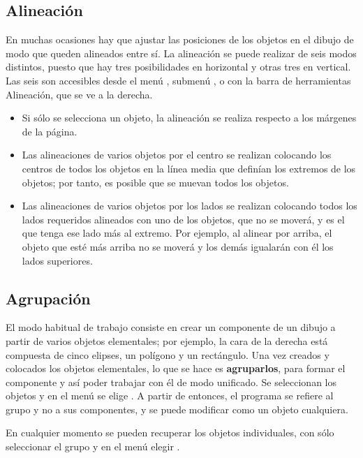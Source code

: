 \subsection{Alineación}

En muchas ocasiones hay que ajustar las posiciones de los objetos en
el dibujo de modo que queden alineados entre sí. La alineación se
puede realizar de seis modos distintos, puesto que hay tres
posibilidades en horizontal y otras tres en vertical. Las seis son
accesibles desde el menú , submenú ,
o con la barra de herramientas Alineación, que se ve a la derecha.

\begin{itemize}
\item Si sólo se selecciona un objeto, la alineación se realiza 
respecto a los márgenes de la página.

\item Las alineaciones de varios objetos por el centro se realizan 
colocando los centros de todos los objetos en la línea media que 
definían los extremos de los objetos; por tanto, es posible que se 
muevan todos los objetos.

\item Las alineaciones de varios objetos por los lados se realizan 
colocando todos los lados requeridos alineados con uno de los 
objetos, que no se moverá, y es el que tenga ese lado más al extremo. 
Por ejemplo, al alinear por arriba, el objeto que esté más arriba 
no se moverá y los demás igualarán con él los lados superiores.
\end{itemize}

\subsection{Agrupación}

El modo habitual de trabajo consiste en crear un componente de un
dibujo a partir de varios objetos elementales; por ejemplo, la cara de
la derecha está compuesta de cinco elipses, un polígono y un
rectángulo. Una vez creados y colocados los objetos elementales, lo
que se hace es \textbf{agruparlos}, para formar el componente y así
poder trabajar con él de modo unificado. Se seleccionan los objetos y
en el menú  se elige . A partir de
entonces, el programa se refiere al grupo y no a sus componentes, y se
puede modificar como un objeto cualquiera.

En cualquier momento se pueden recuperar los objetos individuales, con
sólo seleccionar el grupo y en el menú  elegir
.

